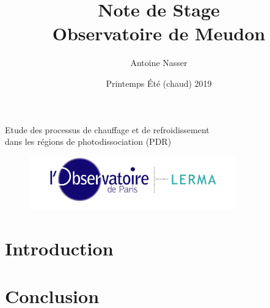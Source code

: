 \documentclass[11pt,a4paper]{article}
\title{Note de Stage\\Observatoire de Meudon}
\author{Antoine Nasser}
\date{Printemps Été (chaud) 2019}
\begin{document}
\begin{spacing}{0.98}


\maketitle
\begin{center}{\Large Etude des processus de chauffage et de refroidissement \\ dans les régions de photodissociation (PDR)}\end{center}


\setcounter{secnumdepth}{4}
\vfill
\begin{figure}[!hb]
        \centering 
        \includegraphics[trim = {0 0 0 0cm},clip,width=0.8\textwidth]{figure/LERMA2.jpg}
\end{figure}
\vfill

\tableofcontents

\setcounter{figure}{0}    

\newpage
 
\section*{Introduction}

\clearpage




\section*{Conclusion}

\clearpage



\clearpage





\end{spacing}
\end{document}
